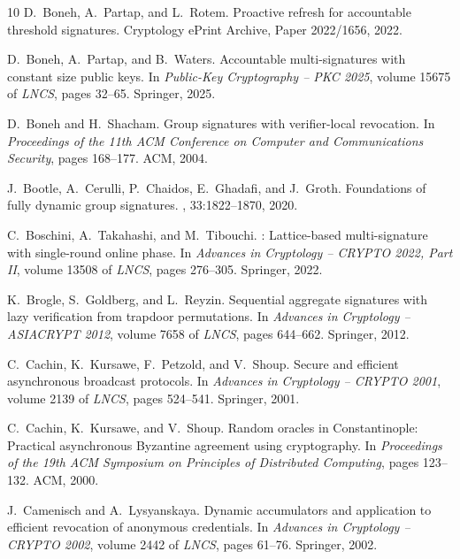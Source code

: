 \documentclass[11pt]{article}
\theoremstyle{definition}
\begin{document}
\begin{thebibliography}{10}
D.~Boneh, A.~Partap, and L.~Rotem.
\newblock Proactive refresh for accountable threshold signatures.
\newblock Cryptology ePrint Archive, Paper 2022/1656, 2022.

D.~Boneh, A.~Partap, and B.~Waters.
\newblock Accountable multi-signatures with constant size public keys.
\newblock In {\em Public-Key Cryptography -- PKC 2025}, volume 15675 of {\em
  LNCS}, pages 32--65. Springer, 2025.

D.~Boneh and H.~Shacham.
\newblock Group signatures with verifier-local revocation.
\newblock In {\em Proceedings of the 11th ACM Conference on Computer and
  Communications Security}, pages 168--177. ACM, 2004.

J.~Bootle, A.~Cerulli, P.~Chaidos, E.~Ghadafi, and J.~Groth.
\newblock Foundations of fully dynamic group signatures.
, 33:1822--1870, 2020.

C.~Boschini, A.~Takahashi, and M.~Tibouchi.
: Lattice-based multi-signature with single-round online
  phase.
\newblock In {\em Advances in Cryptology -- CRYPTO 2022, Part II}, volume 13508
  of {\em LNCS}, pages 276--305. Springer, 2022.

K.~Brogle, S.~Goldberg, and L.~Reyzin.
\newblock Sequential aggregate signatures with lazy verification from trapdoor
  permutations.
\newblock In {\em Advances in Cryptology -- ASIACRYPT 2012}, volume 7658 of
  {\em LNCS}, pages 644--662. Springer, 2012.

C.~Cachin, K.~Kursawe, F.~Petzold, and V.~Shoup.
\newblock Secure and efficient asynchronous broadcast protocols.
\newblock In {\em Advances in Cryptology -- CRYPTO 2001}, volume 2139 of {\em
  LNCS}, pages 524--541. Springer, 2001.

C.~Cachin, K.~Kursawe, and V.~Shoup.
\newblock Random oracles in {Constantinople}: Practical asynchronous
  {Byzantine} agreement using cryptography.
\newblock In {\em Proceedings of the 19th ACM Symposium on Principles of
  Distributed Computing}, pages 123--132. ACM, 2000.

J.~Camenisch and A.~Lysyanskaya.
\newblock Dynamic accumulators and application to efficient revocation of
  anonymous credentials.
\newblock In {\em Advances in Cryptology -- CRYPTO 2002}, volume 2442 of {\em
  LNCS}, pages 61--76. Springer, 2002.


\end{thebibliography}
\end{document}
